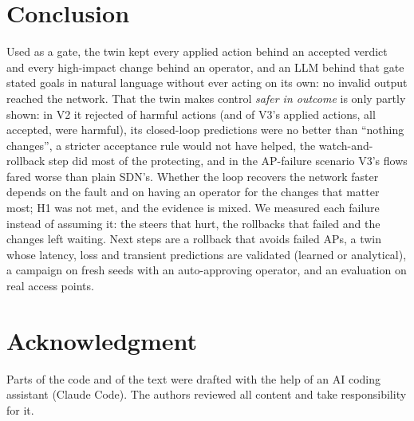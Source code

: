 \documentclass[conference]{IEEEtran}
\begin{document}
\section{Conclusion}
Used as a gate, the twin kept every applied action behind an accepted verdict and every high-impact change behind an operator, and an LLM behind that gate stated goals in natural language without ever acting on its own: no invalid output reached the network. That the twin makes control \emph{safer in outcome} is only partly shown: in V2 it rejected \HarmRejected{} of \HarmAll{} harmful actions (and \HarmVthree{} of V3's applied actions, all accepted, were harmful), its closed-loop predictions were no better than ``nothing changes'', a stricter acceptance rule would not have helped, the watch-and-rollback step did most of the protecting, and in the AP-failure scenario V3's flows fared worse than plain SDN's. Whether the loop recovers the network faster depends on the fault and on having an operator for the changes that matter most; H1 was not met, and the evidence is mixed. We measured each failure instead of assuming it: the steers that hurt, the rollbacks that failed and the changes left waiting. Next steps are a rollback that avoids failed APs, a twin whose latency, loss and transient predictions are validated (learned or analytical), a campaign on fresh seeds with an auto-approving operator, and an evaluation on real access points.

\section*{Acknowledgment}
Parts of the code and of the text were drafted with the help of an AI coding assistant (Claude Code). The authors reviewed all content and take responsibility for it.



\end{document}
